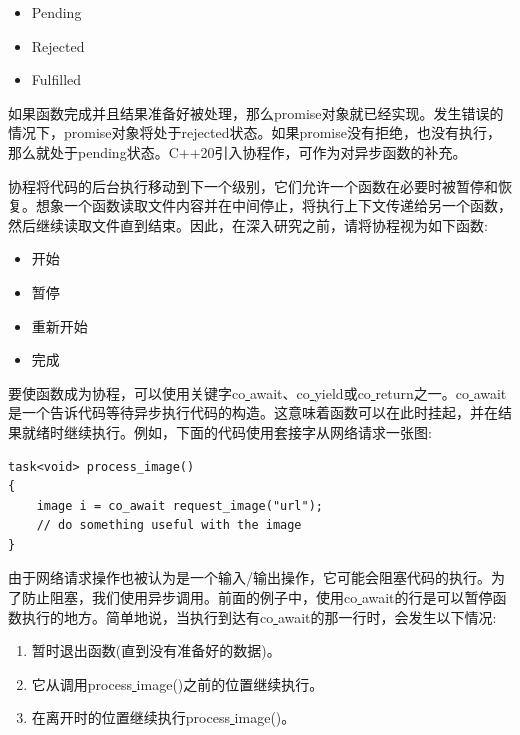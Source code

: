 \begin{itemize}
	\item Pending
	\item Rejected
	\item Fulfilled
\end{itemize}

如果函数完成并且结果准备好被处理，那么promise对象就已经实现。发生错误的情况下，promise对象将处于rejected状态。如果promise没有拒绝，也没有执行，那么就处于pending状态。C++20引入协程作，可作为对异步函数的补充。 \par
协程将代码的后台执行移动到下一个级别，它们允许一个函数在必要时被暂停和恢复。想象一个函数读取文件内容并在中间停止，将执行上下文传递给另一个函数，然后继续读取文件直到结束。因此，在深入研究之前，请将协程视为如下函数: \par

\begin{itemize}
	\item 开始
	\item 暂停
	\item 重新开始
	\item 完成
\end{itemize}

要使函数成为协程，可以使用关键字co\underline{ }await、co\underline{ }yield或co\underline{ }return之一。co\underline{ }await是一个告诉代码等待异步执行代码的构造。这意味着函数可以在此时挂起，并在结果就绪时继续执行。例如，下面的代码使用套接字从网络请求一张图: \par

\begin{lstlisting}[caption={}]
task<void> process_image()
{
	image i = co_await request_image("url");
	// do something useful with the image
}
\end{lstlisting}

由于网络请求操作也被认为是一个输入/输出操作，它可能会阻塞代码的执行。为了防止阻塞，我们使用异步调用。前面的例子中，使用co\underline{ }await的行是可以暂停函数执行的地方。简单地说，当执行到达有co\underline{ }await的那一行时，会发生以下情况: \par

\begin{enumerate}
	\item 暂时退出函数(直到没有准备好的数据)。
	\item 它从调用process\underline{ }image()之前的位置继续执行。
	\item 在离开时的位置继续执行process\underline{ }image()。
\end{enumerate}

